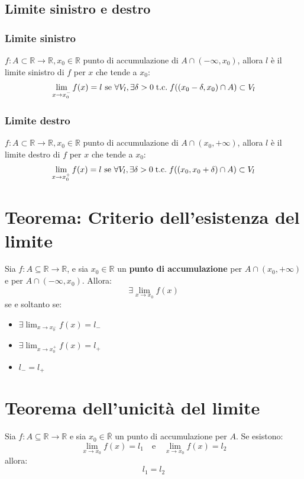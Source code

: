 \documentclass[a4paper,12pt,openright]{book}
\begin{document}
	\subsection{Limite sinistro e destro}
	\subsubsection{Limite sinistro}
	$f: A \subset \mathbb{R} \longrightarrow \mathbb{R}, x_0 \in \mathbb{R}$ punto di accumulazione di $ A \cap(-\infty, x_0)$, allora $l$ è il limite sinistro di $f$ per $x$ che tende a $x_0$:
	\[\lim_{x \rightarrow x_0^-} f(x) = l \text{ se } \forall V_l, \exists \delta > 0 \;\text{t.c.}\; f((x_0 - \delta, x_0) \cap A) \subset V_l\]
	\subsubsection{Limite destro}
	$f: A \subset \mathbb{R} \longrightarrow \mathbb{R}, x_0 \in \mathbb{R}$ punto di accumulazione di $ A \cap(x_0, +\infty)$, allora $l$ è il limite destro di $f$ per $x$ che tende a $x_0$:
	\[\lim_{x \rightarrow x_0^+} f(x) = l \text{ se } \forall V_l, \exists \delta > 0 \;\text{t.c.}\; f((x_0, x_0 + \delta) \cap A) \subset V_l\]
	
	\section{Teorema: Criterio dell'esistenza del limite}
	Sia $f: A \subseteq \mathbb{R} \longrightarrow \mathbb{R}$, e sia $x_0 \in \mathbb{R}$ un \textbf{punto di accumulazione} per $A \cap (x_0, +\infty)$ e per $A \cap (-\infty, x_0)$. Allora:
	\[\exists \lim_{x \rightarrow x_0} f(x)\]
	se e soltanto se:
	\begin{itemize}
		\item $\exists \lim_{x \rightarrow x_0^-} f(x) = l_-$
		\item $\exists \lim_{x \rightarrow x_0^+} f(x) = l_+$
		\item $l_- = l_+$
	\end{itemize}
	
	\newpage
	
	\section{Teorema dell'unicità del limite}
	Sia $f: A \subseteq \mathbb{R} \longrightarrow \mathbb{R}$ e sia $x_0 \in \overline{\mathbb{R}}$ un punto di accumulazione per $A$.  
	Se esistono:
	\[\lim_{x \rightarrow x_0} f(x) = l_1 \quad \text{e} \quad \lim_{x \rightarrow x_0} f(x) = l_2\]
	allora:
	\[l_1 = l_2\]
	
\end{document}
